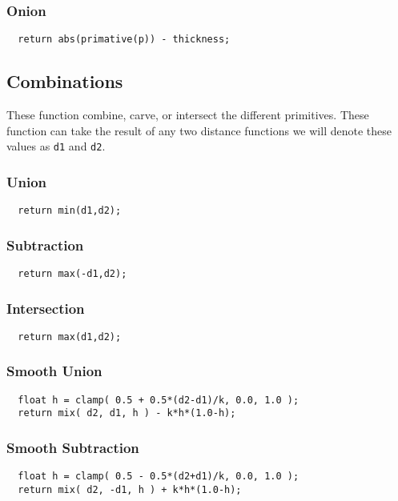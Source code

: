 \documentclass[../pbr.text]{subfile}
\begin{document}
\subsubsection{Onion}%
\label{ssub:onion}
\begin{verbatim}
  return abs(primative(p)) - thickness;
\end{verbatim}

\subsection{Combinations}%
\label{sub:combinations}

These function combine, carve, or intersect the different primitives. These
function can take the result of any two distance functions we will denote these
values as \texttt{d1} and \texttt{d2}.

\subsubsection{Union}%
\label{ssub:union}
\begin{verbatim}
  return min(d1,d2);
\end{verbatim}

\subsubsection{Subtraction}%
\label{ssub:subtraction}
\begin{verbatim}
  return max(-d1,d2);
\end{verbatim}

\subsubsection{Intersection}%
\label{ssub:intersection}
\begin{verbatim}
  return max(d1,d2);
\end{verbatim}

\subsubsection{Smooth Union}%
\label{ssub:smooth_union}
\begin{verbatim}
  float h = clamp( 0.5 + 0.5*(d2-d1)/k, 0.0, 1.0 );
  return mix( d2, d1, h ) - k*h*(1.0-h);
\end{verbatim}

\subsubsection{Smooth Subtraction}%
\label{ssub:smooth_subtraction}
\begin{verbatim}
  float h = clamp( 0.5 - 0.5*(d2+d1)/k, 0.0, 1.0 );
  return mix( d2, -d1, h ) + k*h*(1.0-h);
\end{verbatim}
\end{document}
